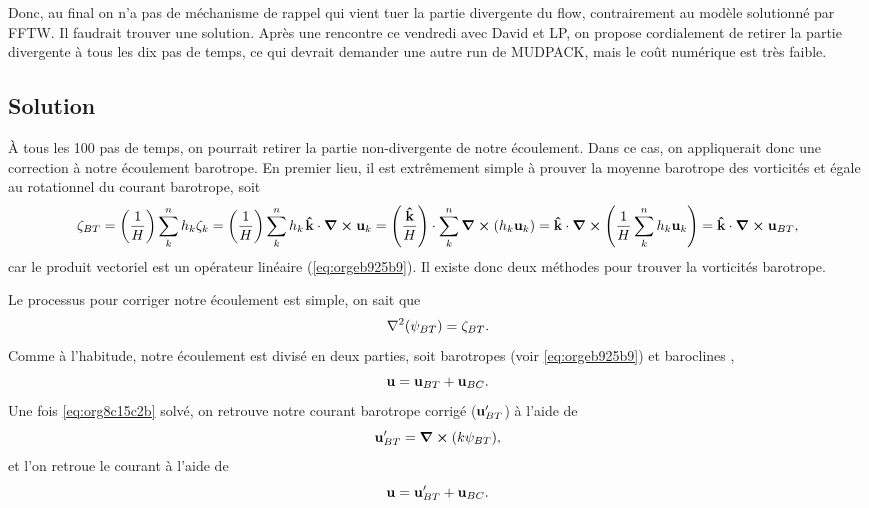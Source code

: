 \documentclass[10pt]{article}
\numberwithin{equation}{section}
\newcommand{\kvf}{\vb{\hat{k}}}
\newcommand{\uu}{\vb{u}}
\newcommand{\pt}{\hspace{1pt}} %
\begin{document}
Donc, au final on n'a pas de méchanisme de rappel qui vient tuer la partie divergente du flow, contrairement au modèle solutionné par FFTW.
Il faudrait trouver une solution.
Après une rencontre ce vendredi avec David et LP, on propose cordialement de retirer la partie divergente à tous les dix pas de temps, ce qui devrait demander une autre run de MUDPACK, mais le coût numérique est très faible.
\subsection{Solution}
\label{sec:org4daf603}

À tous les 100 pas de temps, on pourrait retirer la partie non-divergente de notre écoulement.
Dans ce cas, on appliquerait donc une correction à notre écoulement barotrope.
En premier lieu, il est extrêmement simple à prouver la moyenne barotrope des vorticités et égale au rotationnel du courant barotrope, soit
\begin{equation}
\label{eq:orgeb925b9}
   \zeta_{BT} = \qty(\frac{1}{H})\sum_k^n h_k\zeta_k = \qty(\frac{1}{H})\sum_k^n h_k\pt \kvf \cdot \curl{\uu_k} = \qty(\frac{ \kvf}{H})\cdot\sum_k^n\curl(h_k\uu_k) = \kvf\cdot\curl(\frac{1}{H}\sum_k^n h_k\uu_k) = \kvf\cdot\curl{\uu_{BT}},
\end{equation}
car le produit vectoriel est un opérateur linéaire (\ref{eq:orgeb925b9}).
Il existe donc deux méthodes pour trouver la vorticités barotrope.\bigskip

Le processus pour corriger notre écoulement est simple, on sait que
\begin{equation}
\label{eq:org8c15c2b}
   \laplacian(\psi_{BT}) = \zeta_{BT}.
\end{equation}
Comme à l'habitude, notre écoulement est divisé en deux parties, soit barotropes (voir \ref{eq:orgeb925b9}) et baroclines ,
\begin{equation}
   \uu = \uu_{BT} + \uu_{BC}.
\end{equation}
Une fois \ref{eq:org8c15c2b} solvé, on retrouve notre courant barotrope corrigé (\(\uu_{BT}'\)) à l'aide de
\begin{equation}
   \uu_{BT}' = \curl(k\psi_{BT}),
\end{equation}
et l'on retroue le courant à l'aide de
\begin{equation}
   \uu = \uu_{BT}' + \uu_{BC}.
\end{equation}
\end{document}
